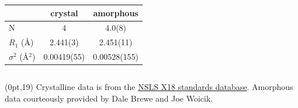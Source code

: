 \begin{frame}[fragile]
\begin{columns}[T]
\begin{column}{0.5\linewidth}
\begin{center}
         \medskip

         \begin{tabular}{lcc}
           & crystal & amorphous \\
           \hline
           N & 4 & 4.0(8) \\
           $R_1$ (\AA) & 2.441(3) & 2.451(11) \\
           $\sigma^2$ (\AA$^2$) & 0.00419(55) & 0.00528(155) \\
         \end{tabular}
       \end{center}
    \end{column}
  \end{columns}
  \begin{textblock*}{0.5\linewidth}(0pt,19\TPVertModule) \tiny
    Crystalline data is from the 
    \href{http://www.nsls.bnl.gov/beamlines/x18b/data.htm}
    {\color{Purple4}NSLS X18 standards database}.
    Amorphous data courteously provided by Dale Brewe and Joe Woicik.
  \end{textblock*}
\end{frame}


